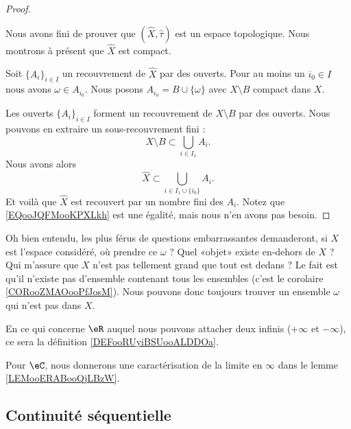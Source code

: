 \begin{proof}
\begin{subproof}
	\end{subproof}
	Nous avons fini de prouver que \( (\hat X, \hat \tau)\) est un espace topologique. Nous montrons à présent que \( \hat X\) est compact.

	Soit \( \{ A_i \}_{i\in I}\) un recouvrement de \( \hat X\) par des ouverts. Pour au moins un \( i_0\in I\) nous avons \( \omega\in A_{i_0}\). Nous posons \( A_{i_0}=B\cup\{ \omega \}\) avec \( X\setminus B\) compact dans \( X\).

	Les ouverts \( \{ A_i \}_{i\in I}\) forment un recouvrement de \( X\setminus B\) par des ouverts. Nous pouvons en extraire un sous-recouvrement fini :
	\begin{equation}
		X\setminus B\subset \bigcup_{i\in I_1}A_i.
	\end{equation}
	Nous avons alors
	\begin{equation}        \label{EQooJQFMooKPXLkh}
		\hat X\subset \bigcup_{i\in I_1\cup\{ i_0 \}}A_i.
	\end{equation}
	Et voilà que \( \hat X\) est recouvert par un nombre fini des \( A_i\). Notez que \eqref{EQooJQFMooKPXLkh} est une égalité, mais nous n'en avons pas besoin.
\end{proof}

\begin{normaltext}
	Oh bien entendu, les plus férus de questions embarrassantes demanderont, si \( X\) est l'espace considéré, où prendre ce \( \omega\) ? Quel «objet» existe en-dehors de \( X\) ? Qui m'assure que \( X\) n'est pas tellement grand que tout est dedans ? Le fait est qu'il n'existe pas d'ensemble contenant tous les ensembles (c'est le corolaire \ref{CORooZMAOooPfJosM}). Nous pouvons donc toujours trouver un ensemble \( \omega\) qui n'est pas dans \( X\).
\end{normaltext}

En ce qui concerne \( \eR\) auquel nous pouvons attacher deux infinis (\( +\infty\) et \( -\infty\)), ce sera la définition \ref{DEFooRUyiBSUooALDDOa}.

Pour \( \eC\), nous donnerons une caractérisation de la limite en \( \infty\) dans le lemme \ref{LEMooERABooQjLBzW}.




\subsection{Continuité séquentielle}

